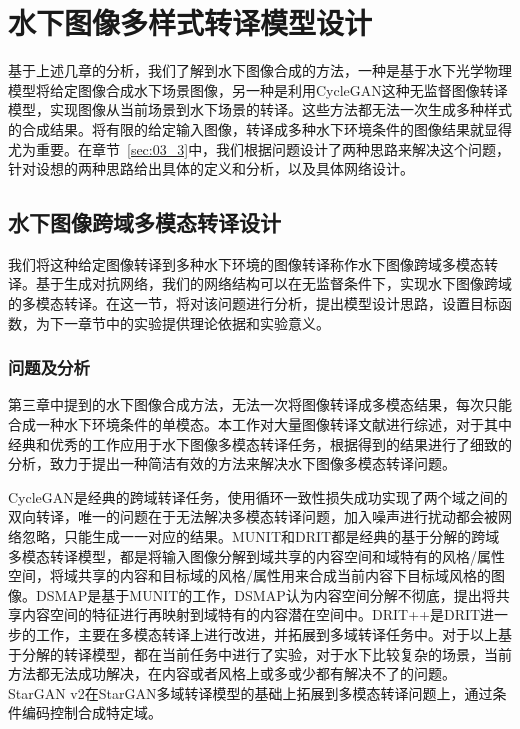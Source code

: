 \chapter{水下图像多样式转译模型设计}
基于上述几章的分析，我们了解到水下图像合成的方法，一种是基于水下光学物理模型将给定图像合成水下场景图像，另一种是利用CycleGAN这种无监督图像转译模型，实现图像从当前场景到水下场景的转译。这些方法都无法一次生成多种样式的合成结果。将有限的给定输入图像，转译成多种水下环境条件的图像结果就显得尤为重要。在章节~\ref{sec:03_3}中，我们根据问题设计了两种思路来解决这个问题，针对设想的两种思路给出具体的定义和分析，以及具体网络设计。

\section{水下图像跨域多模态转译设计}
我们将这种给定图像转译到多种水下环境的图像转译称作水下图像跨域多模态转译。基于生成对抗网络，我们的网络结构可以在无监督条件下，实现水下图像跨域的多模态转译。在这一节，将对该问题进行分析，提出模型设计思路，设置目标函数，为下一章节中的实验提供理论依据和实验意义。

\subsection{问题及分析}
第三章中提到的水下图像合成方法，无法一次将图像转译成多模态结果，每次只能合成一种水下环境条件的单模态。本工作对大量图像转译文献进行综述，对于其中经典和优秀的工作应用于水下图像多模态转译任务，根据得到的结果进行了细致的分析，致力于提出一种简洁有效的方法来解决水下图像多模态转译问题。

CycleGAN是经典的跨域转译任务，使用循环一致性损失成功实现了两个域之间的双向转译，唯一的问题在于无法解决多模态转译问题，加入噪声进行扰动都会被网络忽略，只能生成一一对应的结果。MUNIT和DRIT都是经典的基于分解的跨域多模态转译模型，都是将输入图像分解到域共享的内容空间和域特有的风格/属性空间，将域共享的内容和目标域的风格/属性用来合成当前内容下目标域风格的图像。DSMAP是基于MUNIT的工作，DSMAP认为内容空间分解不彻底，提出将共享内容空间的特征进行再映射到域特有的内容潜在空间中。DRIT++是DRIT进一步的工作，主要在多模态转译上进行改进，并拓展到多域转译任务中。对于以上基于分解的转译模型，都在当前任务中进行了实验，对于水下比较复杂的场景，当前方法都无法成功解决，在内容或者风格上或多或少都有解决不了的问题。StarGAN v2在StarGAN多域转译模型的基础上拓展到多模态转译问题上，通过条件编码控制合成特定域。

